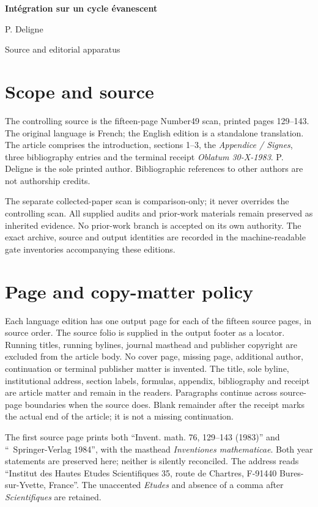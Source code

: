 \documentclass[11pt,leqno]{article}
\begin{document}
\begin{center}
{\Large\bfseries Intégration sur un cycle évanescent}\par
\medskip
{\large P. Deligne}\par
\medskip
{\large Source and editorial apparatus}
\end{center}

\section*{Scope and source}
The controlling source is the fifteen-page Number49 scan, printed pages
129--143. The original language is French; the English edition is a standalone
translation. The article comprises the introduction, sections 1--3, the
\emph{Appendice / Signes}, three bibliography entries and the terminal receipt
\emph{Oblatum 30-X-1983}. P. Deligne is the sole printed author. Bibliographic
references to other authors are not authorship credits.

The separate collected-paper scan is comparison-only; it never overrides the
controlling scan. All supplied audits and prior-work materials remain preserved
as inherited evidence. No prior-work branch is accepted on its own authority.
The exact archive, source and output identities are recorded in the machine-readable
gate inventories accompanying these editions.

\section*{Page and copy-matter policy}
Each language edition has one output page for each of the fifteen source pages,
in source order. The source folio is supplied in the output footer as a locator.
Running titles, running bylines, journal masthead and publisher copyright are
excluded from the article body. No cover page, missing page, additional author,
continuation or terminal publisher matter is invented. The title, sole byline,
institutional address, section labels, formulas, appendix, bibliography and
receipt are article matter and remain in the readers. Paragraphs continue across
source-page boundaries when the source does. Blank remainder after the receipt
marks the actual end of the article; it is not a missing continuation.

The first source page prints both ``Invent. math. 76, 129--143 (1983)'' and
``\textcopyright\ Springer-Verlag 1984'', with the masthead
\emph{Inventiones mathematicae}. Both year statements are preserved here;
neither is silently reconciled. The address reads ``Institut des Hautes Etudes
Scientifiques 35, route de Chartres, F-91440 Bures-sur-Yvette, France''.
The unaccented \emph{Etudes} and absence of a comma after \emph{Scientifiques}
are retained.
\end{document}
